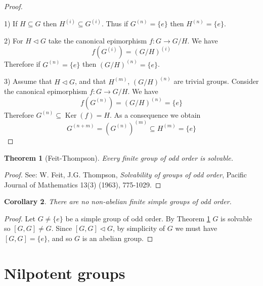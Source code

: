 \documentclass[12pt, letterpaper, oneside]{article}
\theoremstyle{plain}
\newtheorem{theorem}{Theorem}[section]
\newtheorem{corollary}[theorem]{Corollary}
\theoremstyle{definition}
\newcommand{\Ker}{\operatorname{Ker}}
\newcommand{\vs}{\vskip 5mm}
\begin{document}
\vs

\begin{proof} \ 

1) If  $H\subseteq G$ then $H^{(i)} \subseteq G^{(i)}$. Thus
if $G^{(n)} = \{e\}$ then $H^{(n)} = \{e\}$.

\vs

2) For $H\lhd G$ take the canonical epimorphism $f\colon G \to G/H$. 
We have 
$$f(G^{(i)}) = (G/H)^{(i)}$$
Therefore if $G^{(n)} =\{e\}$ then $(G/H)^{(n)} = \{e\}$.

\vs

3) Assume that $H\lhd G$, and that $H^{(m)}$, $(G/H)^{(n)}$ are trivial groups. Consider the  
canonical epimorphism $f\colon G \to G/H$. We have 
$$f(G^{(n)}) = (G/H)^{(n)} = \{e\}$$
Therefore $G^{(n)}\subseteq \Ker(f) = H$. As a consequence we obtain
$$G^{(n+m)} = \left(G^{(n)}\right)^{(m)} \subseteq H^{(m)} = \{ e\}$$
 
 \end{proof}

 

\vs\vs

\begin{theorem}[Feit-Thompson]
\label{THM_FEITTHOMPSON}
Every finite group of odd order is solvable. 
\end{theorem}

\begin{proof}
See:
W. Feit, J.G. Thompson, \emph{Solvability of groups of odd order}, 
 Pacific Journal of Mathematics 13(3) (1963), 775-1029.

\end{proof}

\vs\vs


\begin{corollary}
There are no non-abelian finite simple groups of odd order.  
\end{corollary}

\vs

\begin{proof}
Let $G\neq \{e\}$ be a simple group of odd order. By Theorem \ref{THM_FEITTHOMPSON}
$G$ is solvable so $[G, G]\neq G$. Since $[G, G]\lhd G$, by simplicity of $G$ we must 
have $[G, G] = \{e\}$, and so $G$ is an abelian group. 
\end{proof}




\newpage
\section{Nilpotent groups}
\label{SEC_NILPGPS}
\end{document}
